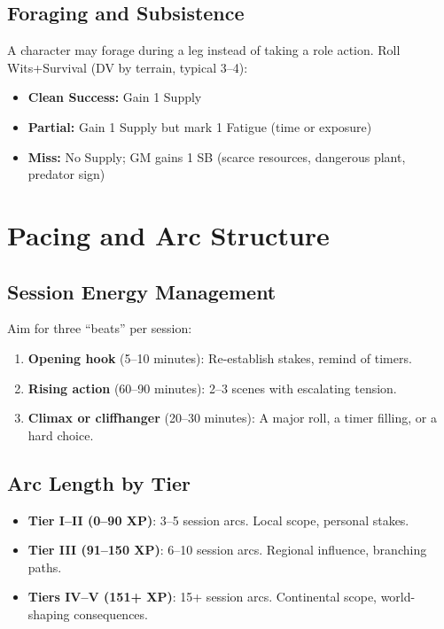 \subsection{Foraging and Subsistence}
A character may forage during a leg instead of taking a role action. Roll Wits+Survival (DV by terrain, typical 3--4):
\begin{itemize}
  \item \textbf{Clean Success:} Gain 1 Supply
  \item \textbf{Partial:} Gain 1 Supply but mark 1 Fatigue (time or exposure)
  \item \textbf{Miss:} No Supply; GM gains 1 SB (scarce resources, dangerous plant, predator sign)
\end{itemize}

\section{Pacing and Arc Structure}
\label{sec:pacing-arcs}

\subsection{Session Energy Management}
Aim for three ``beats'' per session:
\begin{enumerate}
  \item \textbf{Opening hook} (5--10 minutes): Re-establish stakes, remind of timers.
  \item \textbf{Rising action} (60--90 minutes): 2--3 scenes with escalating tension.
  \item \textbf{Climax or cliffhanger} (20--30 minutes): A major roll, a timer filling, or a hard choice.
\end{enumerate}

\subsection{Arc Length by Tier}
\begin{itemize}
  \item \textbf{Tier I--II (0--90 XP)}: 3--5 session arcs. Local scope, personal stakes.
  \item \textbf{Tier III (91--150 XP)}: 6--10 session arcs. Regional influence, branching paths.
  \item \textbf{Tiers IV--V (151+ XP)}: 15+ session arcs. Continental scope, world-shaping consequences.
\end{itemize}

